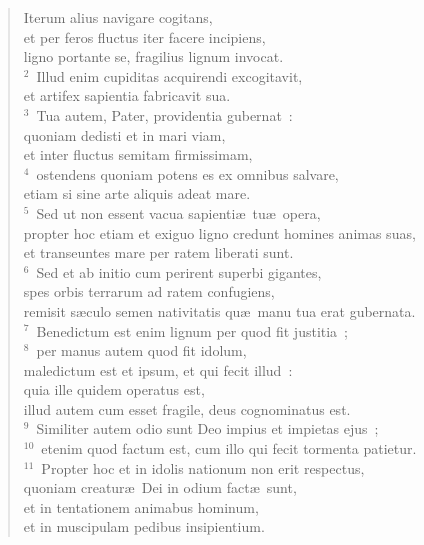 \begin{flushleft}\begin{verse}\vspace{-19pt}\hspace{6pt}Iterum alius navigare cogitans,\\\hspace{6pt} et per feros fluctus iter facere incipiens,\\ ligno portante se, fragilius lignum invocat.\\
${}^{2}$~Illud enim cupiditas acquirendi excogitavit,\\ et artifex sapientia fabricavit sua.\\
${}^{3}$~Tua autem, Pater, providentia gubernat~:\\ quoniam dedisti et in mari viam,\\ et inter fluctus semitam firmissimam,\\
${}^{4}$~ostendens quoniam potens es ex omnibus salvare,\\ etiam si sine arte aliquis adeat mare.\\
${}^{5}$~Sed ut non essent vacua sapienti\ae\ tu\ae\ opera,\\ propter hoc etiam et exiguo ligno credunt homines animas suas,\\ et transeuntes mare per ratem liberati sunt.\\
${}^{6}$~Sed et ab initio cum perirent superbi gigantes,\\ spes orbis terrarum ad ratem confugiens,\\ remisit s\ae culo semen nativitatis qu\ae\ manu tua erat gubernata.\\
${}^{7}$~Benedictum est enim lignum per quod fit justitia~;\\
${}^{8}$~per manus autem quod fit idolum,\\ maledictum est et ipsum, et qui fecit illud~:\\ quia ille quidem operatus est,\\ illud autem cum esset fragile, deus cognominatus est.\\
${}^{9}$~Similiter autem odio sunt Deo impius et impietas ejus~;\\
${}^{10}$~etenim quod factum est, cum illo qui fecit tormenta patietur.\\
${}^{11}$~Propter hoc et in idolis nationum non erit respectus,\\ quoniam creatur\ae\ Dei in odium fact\ae\ sunt,\\ et in tentationem animabus hominum,\\ et in muscipulam pedibus insipientium.\\

\end{verse}
\end{flushleft}

